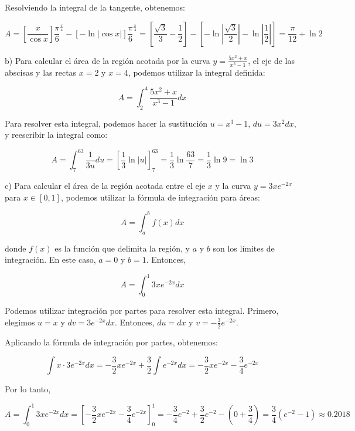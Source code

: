 \documentclass[a4paper, oneside]{report}
\begin{document}
Resolviendo la integral de la tangente, obtenemos:

$$A = \left[\frac{x}{\cos{x}}\right]{\frac{\pi}{6}}^{\frac{\pi}{4}} - \left[-\ln{|\cos{x}|}\right]{\frac{\pi}{6}}^{\frac{\pi}{4}} = \left[\frac{\sqrt{3}}{3} - \frac{1}{2}\right] - \left[-\ln{\left|\frac{\sqrt{3}}{2}\right|} - \ln{\left|\frac{1}{2}\right|}\right] = \frac{\pi}{12} + \ln{2}$$


b) Para calcular el área de la región acotada por la curva $y = \frac{5x^2+x}{x^3-1}$, el eje de las abscisas y las rectas $x = 2$ y $x= 4$, podemos utilizar la integral definida:

$$A = \int_{2}^{4} \frac{5x^2+x}{x^3-1} dx$$

Para resolver esta integral, podemos hacer la sustitución $u = x^3-1$, $du = 3x^2dx$, y reescribir la integral como:

$$A = \int_{7}^{63} \frac{1}{3u} du = \left[\frac{1}{3}\ln{|u|}\right]_{7}^{63} = \frac{1}{3}\ln{\frac{63}{7}} = \frac{1}{3}\ln{9} = \ln{3}$$


c) Para calcular el área de la región acotada entre el eje $x$ y la curva $y=3xe^{-2x}$ para $x\in [0,1]$, podemos utilizar la fórmula de integración para áreas:

$$A = \int_{a}^{b} f(x)dx$$

donde $f(x)$ es la función que delimita la región, y $a$ y $b$ son los límites de integración. En este caso, $a=0$ y $b=1$. Entonces,

$$A = \int_{0}^{1} 3xe^{-2x}dx$$

Podemos utilizar integración por partes para resolver esta integral. Primero, elegimos $u=x$ y $dv=3e^{-2x}dx$. Entonces, $du=dx$ y $v=-\frac{3}{2}e^{-2x}$.

Aplicando la fórmula de integración por partes, obtenemos:

$$\int x\cdot3e^{-2x}dx = -\frac{3}{2}xe^{-2x}+\frac{3}{2}\int e^{-2x}dx = -\frac{3}{2}xe^{-2x}-\frac{3}{4}e^{-2x}$$

Por lo tanto,

$$A = \int_{0}^{1} 3xe^{-2x}dx = \left[-\frac{3}{2}xe^{-2x}-\frac{3}{4}e^{-2x}\right]_{0}^{1} = -\frac{3}{4}e^{-2}+\frac{3}{2}e^{-2}-\left(0+\frac{3}{4}\right) = \frac{3}{4}(e^{-2}-1) \approx 0.2018$$

\end{document}
